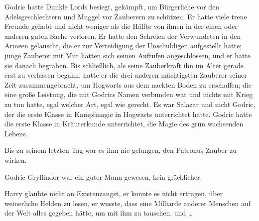 Godric hatte Dunkle Lords besiegt, gekämpft, um Bürgerliche vor den Adelsgeschlechtern und Muggel vor Zauberern zu schützen. Er hatte viele treue Freunde gehabt und nicht weniger als die Hälfte von ihnen in der einen oder anderen guten Sache verloren. Er hatte den Schreien der Verwundeten in den Armeen gelauscht, die er zur Verteidigung der Unschuldigen aufgestellt hatte; junge Zauberer mit Mut hatten sich seinen Aufrufen angeschlossen, und er hatte sie danach begraben. Bis schließlich, als seine Zauberkraft ihn im Alter gerade erst zu verlassen begann, hatte er die drei anderen mächtigsten Zauberer seiner Zeit zusammengebracht, um Hogwarts aus dem nackten Boden zu erschaffen; die eine große Leistung, die mit Godrics Namen verbunden war und nichts mit Krieg zu tun hatte, egal welcher Art, egal wie gerecht. Es war Salazar und nicht Godric, der die erste Klasse in Kampfmagie in Hogwarts unterrichtet hatte. Godric hatte die erste Klasse in Kräuterkunde unterrichtet, die Magie des grün wachsenden Lebens.

Bis zu seinem letzten Tag war es ihm nie gelungen, den Patronus-Zauber zu wirken.

Godric Gryffindor war ein guter Mann gewesen, kein glücklicher.

Harry glaubte nicht an Existenzangst, er konnte es nicht ertragen, über weinerliche Helden zu lesen, er wusste, dass eine Milliarde anderer Menschen auf der Welt alles gegeben hätte, um mit ihm zu tauschen, und …

